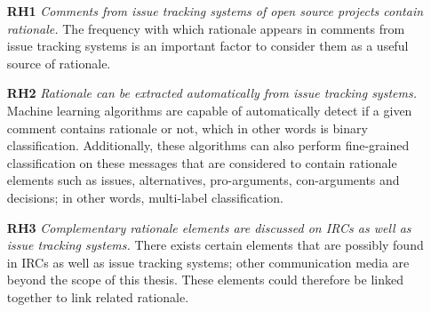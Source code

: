 \documentclass[a4paper,12pt,twoside]{report}
\begin{document}
\begin{itemize}
\item[\textbf{RH1}] \textit{Comments from issue tracking systems of open source projects contain rationale.} The frequency with which rationale appears in comments from issue tracking systems is an important factor to consider them as a useful source of rationale.   
\item[\textbf{RH2}] \textit{Rationale can be extracted automatically from issue tracking systems.} Machine learning algorithms are capable of automatically detect if a given comment contains rationale or not, which in other words is binary classification. Additionally, these algorithms can also perform fine-grained classification on these messages that are considered to contain rationale elements such as issues, alternatives, pro-arguments, con-arguments and decisions; in other words, multi-label classification. 
\item[\textbf{RH3}] \textit{Complementary rationale elements are discussed on \acs{IRC}s as well as issue tracking systems.} There exists certain elements that are possibly found in \acs{IRC}s as well as issue tracking systems; other communication media are beyond the scope of this thesis. These elements could therefore be linked together to link related rationale.    
\end{itemize}
\end{document}
